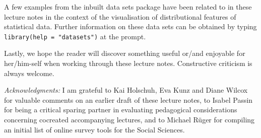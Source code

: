 \medskip
\noindent
A few examples from the inbuilt \R{} data sets package have
been related to in these lecture notes in the context of the
visualisation of distributional features of statistical data.
Further information on these data sets can be obtained by typing
\texttt{library(help = "datasets")} at the \R{} prompt.

\medskip
\noindent
Lastly, we hope the reader will discover something useful or/and
enjoyable for her/him-self when working through these lecture
notes. Constructive criticism is always welcome.

\vfill
\medskip
\noindent
\textit{Acknowledgments:} I am grateful to Kai Holschuh, Eva 
Kunz and Diane Wilcox for valuable comments on an earlier draft of 
these lecture notes, to Isabel Passin for being a critical sparing
partner in evaluating pedagogical considerations concerning
cocreated accompanying lectures, and to Michael R\"{u}ger for
compiling an initial list of online survey tools for the Social
Sciences.

